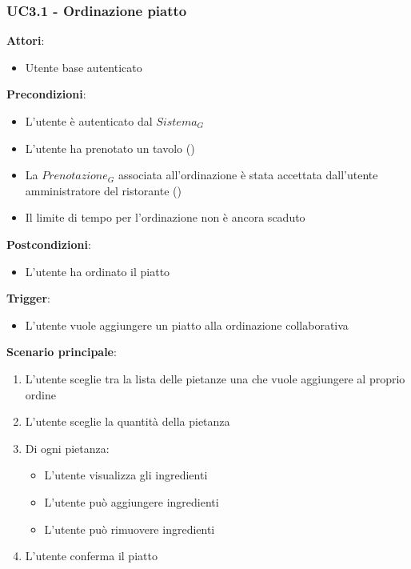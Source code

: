 \subsubsection{UC3.1 - Ordinazione piatto}\label{usecase:3_1}

\textbf{Attori}:
\begin{itemize}
    \item Utente base autenticato
\end{itemize}
\textbf{Precondizioni}:
\begin{itemize}
    \item L'utente è autenticato dal $\textit{Sistema}_G$ 
    \item L'utente ha prenotato un tavolo ()
    \item La $\textit{Prenotazione}_G$ associata all'ordinazione è stata accettata dall'utente amministratore del ristorante ()
    \item Il limite di tempo per l'ordinazione non è ancora scaduto
\end{itemize}
\textbf{Postcondizioni}:
\begin{itemize}
    \item L'utente ha ordinato il piatto
\end{itemize}
\textbf{Trigger}:
\begin{itemize}
    \item L'utente vuole aggiungere un piatto alla ordinazione collaborativa
\end{itemize}
\textbf{Scenario principale}:
\begin{enumerate}
    \item L'utente sceglie tra la lista delle pietanze una che vuole aggiungere al proprio ordine
    \item L'utente sceglie la quantità della pietanza
    \item Di ogni pietanza:
    \begin{itemize}
        \item L'utente visualizza gli ingredienti
        \item L'utente può aggiungere ingredienti
        \item L'utente può rimuovere ingredienti
    \end{itemize}
    \item L'utente conferma il piatto
\end{enumerate}
\newpage


